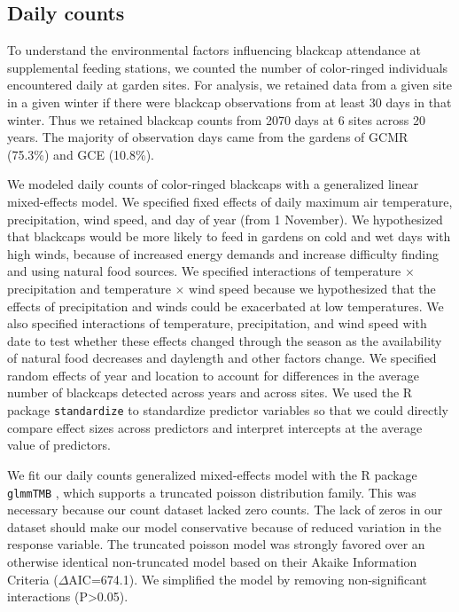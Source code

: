 \documentclass[a4paper, twoside]{templates/ociamthesis}
\begin{document}
\hypertarget{daily-counts}{%
\subsection{Daily counts}\label{daily-counts}}

To understand the environmental factors influencing blackcap attendance at supplemental feeding stations, we counted the number of color-ringed individuals encountered daily at garden sites. For analysis, we retained data from a given site in a given winter if there were blackcap observations from at least 30 days in that winter. Thus we retained blackcap counts from 2070 days at 6 sites across 20 years. The majority of observation days came from the gardens of GCMR (75.3\%) and GCE (10.8\%).

We modeled daily counts of color-ringed blackcaps with a generalized linear mixed-effects model. We specified fixed effects of daily maximum air temperature, precipitation, wind speed, and day of year (from 1 November). We hypothesized that blackcaps would be more likely to feed in gardens on cold and wet days with high winds, because of increased energy demands and increase difficulty finding and using natural food sources. We specified interactions of temperature \(\times\) precipitation and temperature \(\times\) wind speed because we hypothesized that the effects of precipitation and winds could be exacerbated at low temperatures. We also specified interactions of temperature, precipitation, and wind speed with date to test whether these effects changed through the season as the availability of natural food decreases and daylength and other factors change. We specified random effects of year and location to account for differences in the average number of blackcaps detected across years and across sites. We used the R package \texttt{standardize} to standardize predictor variables so that we could directly compare effect sizes across predictors and interpret intercepts at the average value of predictors.

We fit our daily counts generalized mixed-effects model with the R package \texttt{glmmTMB} \autocite{brooksGlmmTMBBalancesSpeed2017}, which supports a truncated poisson distribution family. This was necessary because our count dataset lacked zero counts. The lack of zeros in our dataset should make our model conservative because of reduced variation in the response variable. The truncated poisson model was strongly favored over an otherwise identical non-truncated model based on their Akaike Information Criteria (\(\Delta\)AIC=674.1). We simplified the model by removing non-significant interactions (P\textgreater0.05).
\end{document}
